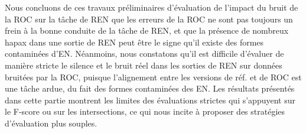 Nous concluons de ces travaux préliminaires d'évaluation de l'impact du bruit de la ROC sur la tâche de REN que les erreurs de la ROC ne sont pas toujours un frein à la bonne conduite de la tâche de REN, et que la présence de nombreux hapax dans une sortie de REN peut être le signe qu'il existe des formes contaminées d'EN. Néanmoins, nous constatons qu'il est difficile d'évaluer de manière stricte le silence et le bruit réel dans les sorties de REN sur données bruitées par la ROC, puisque l'alignement entre les versions de réf. et de ROC est une tâche ardue, du fait des formes contaminées des EN. Les résultats présentés dans cette partie montrent les limites des évaluations strictes qui s'appuyent sur le F-score ou sur les intersections, ce qui nous incite à proposer des stratégies d’évaluation plus souples.


